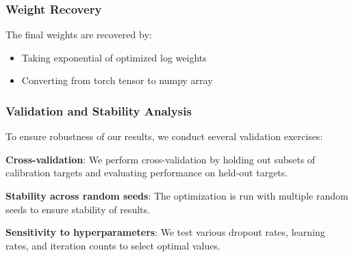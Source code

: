 \subsubsection{Weight Recovery}

The final weights are recovered by:
\begin{itemize}
    \item Taking exponential of optimized log weights
    \item Converting from torch tensor to numpy array
\end{itemize}

\subsubsection{Validation and Stability Analysis}

To ensure robustness of our results, we conduct several validation exercises:

\textbf{Cross-validation}: We perform cross-validation by holding out subsets of calibration targets and evaluating performance on held-out targets.

\textbf{Stability across random seeds}: The optimization is run with multiple random seeds to ensure stability of results.

\textbf{Sensitivity to hyperparameters}: We test various dropout rates, learning rates, and iteration counts to select optimal values.